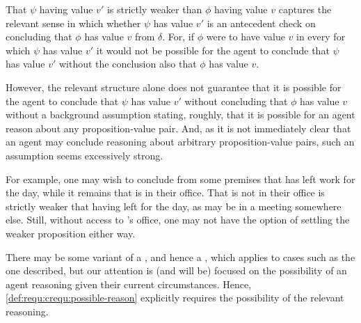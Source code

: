 \begin{note}[Weaker]
  That \(\psi\) having value \(v'\) is strictly weaker than \(\phi\) having value \(v\) captures the relevant sense in which whether \(\psi\) has value \(v'\) is an antecedent check on concluding that \(\phi\) has value \(v\) from \(\delta\).
  For, if \(\phi\) were to have value \(v\) in every \epVW{} for which \(\psi\) has value \(v'\) it would not be possible for the agent to conclude that \(\psi\) has value \(v'\) without the conclusion also \indicateV{} that \(\phi\) has value \(v\).

  However, the relevant structure alone does not guarantee that it is possible for the agent to conclude that \(\psi\) has value \(v'\) without concluding that \(\phi\) has value \(v\) without a background assumption stating, roughly, that it is possible for an agent reason about any proposition-value pair.
  And, as it is not immediately clear that an agent may conclude reasoning about arbitrary proposition-value pairs, such an assumption seems excessively strong.

  For example, one may wish to conclude from some premises that  has left work for the day, while it remains \epVAd{} that  is in their office.
  That  is not in their office is strictly weaker that  having left for the day, as  may be in a meeting somewhere else.
  Still, without access to 's office, one may not have the option of settling the weaker proposition either way.

  There may be some variant of a \ideaCS{}, and hence a \requ{}, which applies to cases such as the one described, but our attention is (and will be) focused on the possibility of an agent reasoning given their current circumstances.
  Hence, \ref{def:requ:crequ:possible-reason} explicitly requires the possibility of the relevant reasoning.
\end{note}



